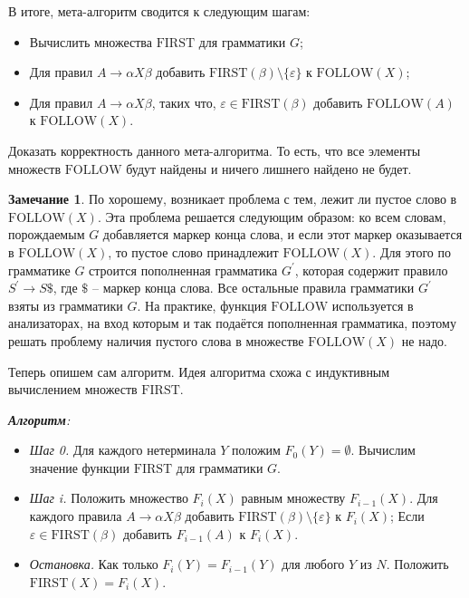 \documentclass[12pt]{article}
\theoremstyle{definiton}
\theoremstyle{definition}
\newtheorem{Remark}{Замечание}
\theoremstyle{definition}
\theoremstyle{definition}
\let\es\emptyset
\let\eps\varepsilon
\def\first{\mathrm{ FIRST} }
\def\follow{\mathrm{ FOLLOW} }
\newcounter{problem}
\newcounter{uproblem}
\newcounter{subproblem}
\def\upr{\medskip\noindent\stepcounter{uproblem}{\bf Упражнение \theuproblem .  }\setcounter{subproblem}{0} }
\begin{document}
В итоге, мета-алгоритм сводится к следующим шагам:

\begin{itemize}
	\item Вычислить множества $\first$ для грамматики $G$;
	\item Для правил $A \to \alpha X \beta$ добавить $\first(\beta)\setminus\{\eps\}$ к $\follow(X)$;
	\item Для правил $A \to \alpha X \beta$, таких что, $\eps \in \first(\beta)$ добавить $\follow(A)$ к $\follow(X)$.
\end{itemize}

\upr Доказать корректность данного мета-алгоритма. То есть, что все элементы множеств $\follow$ будут найдены и ничего лишнего найдено не будет.

\begin{Remark}
	По хорошему, возникает проблема с тем, лежит ли пустое слово в $\follow(X)$. Эта проблема решается следующим образом: ко всем словам, порождаемым $G$ добавляется маркер конца слова, и если этот маркер оказывается в $\follow(X)$, то пустое слово принадлежит $\follow(X)$. Для этого по грамматике $G$ строится пополненная грамматика $G^\prime$, которая содержит правило $S^\prime \to S\$$, где $\$$ -- маркер конца слова. Все остальные правила грамматики $G^\prime$ взяты из грамматики $G$. На практике, функция $\follow$ используется в анализаторах, на вход которым и так подаётся пополненная грамматика, поэтому решать проблему наличия пустого слова в множестве $\follow(X)$ не надо. 	
\end{Remark}

Теперь опишем сам алгоритм. Идея алгоритма схожа с индуктивным вычислением множеств $\first$.

\newpage

\emph{\textbf{Алгоритм}:} 

\begin{itemize}
	\item[ ] \emph{Шаг 0.}  Для каждого нетерминала $Y$ положим $F_0(Y) = \es$. Вычислим значение функции $\first$ для грамматики $G$. 
	\item[ ] \emph{Шаг i.}  Положить множество $F_i(X)$ равным множеству $F_{i-1}(X)$. Для каждого правила $A \to \alpha X \beta$ добавить $\first(\beta)\setminus\{\eps\}$ к $F_i(X)$; Если $\eps \in \first(\beta)$ добавить $F_{i-1}(A)$ к $F_{i}(X)$.
	\item[ ] \emph{Остановка.} Как только $F_i(Y) = F_{i-1}(Y)$ для любого $Y$ из $N$. Положить $\first(X) = F_i(X)$.
\end{itemize}
\end{document}
